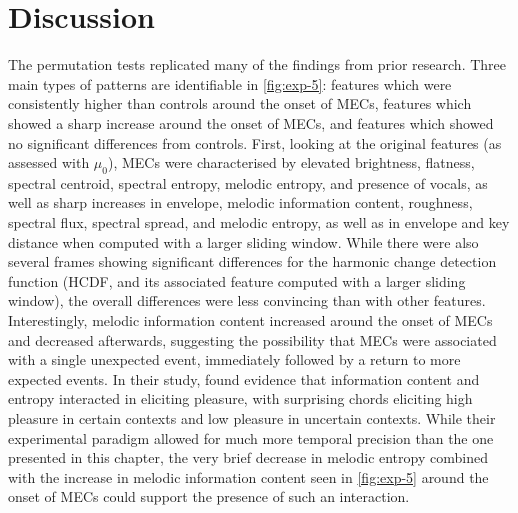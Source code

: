 \section{Discussion}

The permutation tests replicated many of the findings from prior research. Three main types of patterns are identifiable in \autoref{fig:exp-5}: features which were consistently higher than controls around the onset of MECs, features which showed a sharp increase around the onset of MECs, and features which showed no significant differences from controls. First, looking at the original features (as assessed with $\mu_0$), MECs were characterised by elevated brightness, flatness, spectral centroid, spectral entropy, melodic entropy, and presence of vocals, as well as sharp increases in envelope, melodic information content, roughness, spectral flux, spectral spread, and melodic entropy, as well as in envelope and key distance when computed with a larger sliding window. While there were also several frames showing significant differences for the harmonic change detection function (HCDF, and its associated feature computed with a larger sliding window), the overall differences were less convincing than with other features. Interestingly, melodic information content increased around the onset of MECs and decreased afterwards, suggesting the possibility that MECs were associated with a single unexpected event, immediately followed by a return to more expected events. In their study, \textcite{cheung2019} found evidence that information content and entropy interacted in eliciting pleasure, with surprising chords eliciting high pleasure in certain contexts and low pleasure in uncertain contexts. While their experimental paradigm allowed for much more temporal precision than the one presented in this chapter, the very brief decrease in melodic entropy combined with the increase in melodic information content seen in \autoref{fig:exp-5} around the onset of MECs could support the presence of such an interaction.

